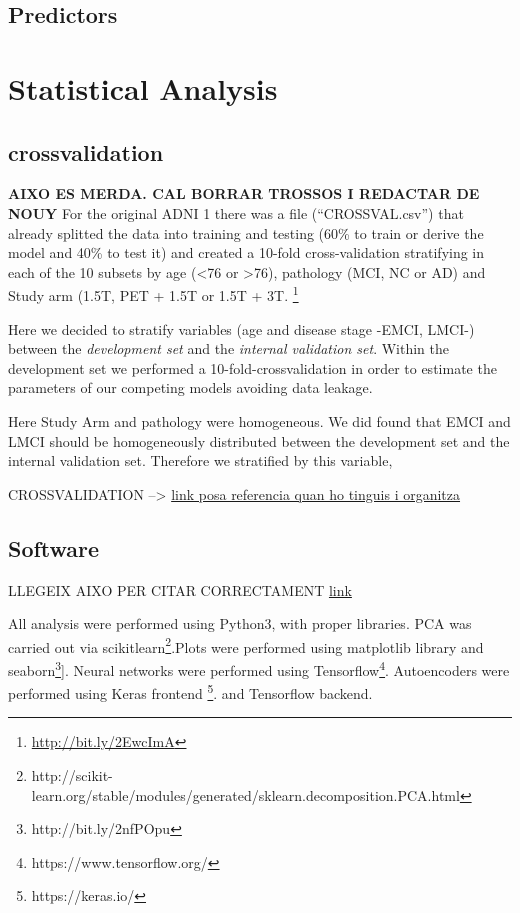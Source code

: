 	\subsection{Predictors}
	


\section{Statistical Analysis} %

		
	\subsection{crossvalidation} \label{seccio_cross_Validation}
		\textbf{AIXO ES MERDA. CAL BORRAR TROSSOS I REDACTAR DE NOUY}
		For the original ADNI 1 there was a file (``CROSSVAL.csv'') that already
		splitted the data into training and testing (60\% to train or derive the model and 40\% to test it) and created a 10-fold cross-validation stratifying in each of the 10 subsets by age (\textless 76 or \textgreater 76), pathology (MCI, NC or AD) and Study arm (1.5T, PET + 1.5T or 1.5T + 3T. \footnote{\href{http://bit.ly/2EwcImA}{http://bit.ly/2EwcImA}}
				
		Here we decided to stratify variables (age and disease stage -EMCI, LMCI-) between the \textit{development set} and the \textit{internal validation set}. Within the development set we performed a 10-fold-crossvalidation in order to estimate the parameters of our competing models avoiding data leakage.  
			
		Here Study Arm and pathology were homogeneous. We did found that EMCI and LMCI should be homogeneously distributed between the development set and the internal validation set. Therefore we stratified by this variable,
			
		CROSSVALIDATION -->  \href{(https://adni.loni.usc.edu/wp-content/uploads/2012/08/slide_data_training_part2_reduced-size.pdf)}{link posa referencia quan ho tinguis i organitza}
		

	\subsection{Software}
			
		LLEGEIX AIXO PER CITAR CORRECTAMENT \href{http://www.citethisforme.com/guides/vancouver/how-to-cite-a-software}{link}
				
		All analysis were performed using Python3, with proper libraries. PCA was carried out via scikitlearn\footnote{http://scikit-learn.org/stable/modules/generated/sklearn.decomposition.PCA.html}.Plots were performed using matplotlib library and seaborn\footnote{http://bit.ly/2nfPOpu}]. Neural networks were performed using Tensorflow\footnote{https://www.tensorflow.org/}. Autoencoders were performed using Keras frontend \footnote {https://keras.io/}. and Tensorflow backend.
			

			
			
			
			